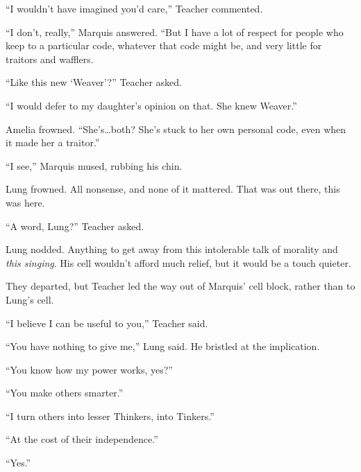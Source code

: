 ``I wouldn't have imagined you'd care,'' Teacher commented.



``I don't, really,'' Marquis answered.  ``But I have a lot of respect for people who keep to a particular code, whatever that code might be, and very little for traitors and wafflers.



``Like this new `Weaver'?'' Teacher asked.



``I would defer to my daughter's opinion on that.  She knew Weaver.''



Amelia frowned.  ``She's\ldots both?  She's stuck to her own personal code, even when it made her a traitor.''



``I see,'' Marquis mused, rubbing his chin.



Lung frowned.  All nonsense, and none of it mattered.  That was out there, this was here.



``A word, Lung?'' Teacher asked.



Lung nodded.  Anything to get away from this intolerable talk of morality and \emph{this singing}.  His cell wouldn't afford much relief, but it would be a touch quieter.



They departed, but Teacher led the way out of Marquis' cell block, rather than to Lung's cell.



``I believe I can be useful to you,'' Teacher said.



``You have nothing to give me,'' Lung said.  He bristled at the implication.



``You know how my power works, yes?''



``You make others smarter.''



``I turn others into lesser Thinkers, into Tinkers.''



``At the cost of their independence.''



``Yes.''



